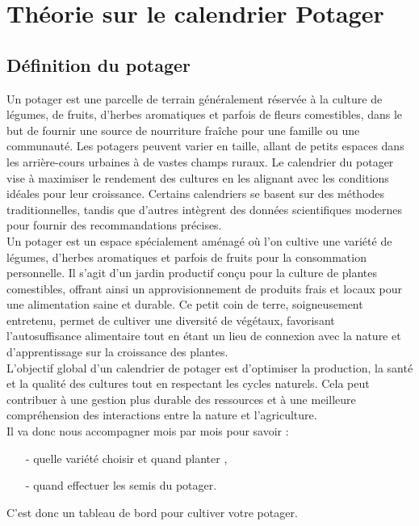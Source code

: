 \chapter{Théorie sur le calendrier Potager}
	\minitoc
	\newpage
\section{Définition du potager}
 Un potager est une parcelle de terrain généralement réservée à la culture de légumes, de fruits, d'herbes aromatiques et parfois de fleurs comestibles, dans le but de fournir une source de nourriture fraîche pour une famille ou une communauté. Les potagers peuvent varier en taille, allant de petits espaces dans les arrière-cours urbaines à de vastes champs ruraux. Le calendrier du potager vise à maximiser le rendement des cultures en les alignant avec les conditions idéales pour leur croissance. Certains calendriers se basent sur des méthodes traditionnelles, tandis que d'autres intègrent des données scientifiques modernes pour fournir des recommandations précises. \\
 Un potager est un espace spécialement aménagé où l'on cultive une variété de légumes, d'herbes aromatiques et parfois de fruits pour la consommation personnelle. Il s'agit d'un jardin productif conçu pour la culture de plantes comestibles, offrant ainsi un approvisionnement de produits frais et locaux pour une alimentation saine et durable. Ce petit coin de terre, soigneusement entretenu, permet de cultiver une diversité de végétaux, favorisant l'autosuffisance alimentaire tout en étant un lieu de connexion avec la nature et d'apprentissage sur la croissance des plantes.\\
L'objectif global d'un calendrier de potager est d'optimiser la production, la santé et la qualité des cultures tout en respectant les cycles naturels. Cela peut contribuer à une gestion plus durable des ressources et à une meilleure compréhension des interactions entre la nature et l'agriculture.\\
Il va donc nous accompagner mois par mois pour savoir :\\
\begin{itemize}
	\item[-]quelle variété choisir et quand planter ,
	\item[-]quand effectuer les semis du potager.
\end{itemize}
C'est donc un tableau de bord pour cultiver votre potager.
